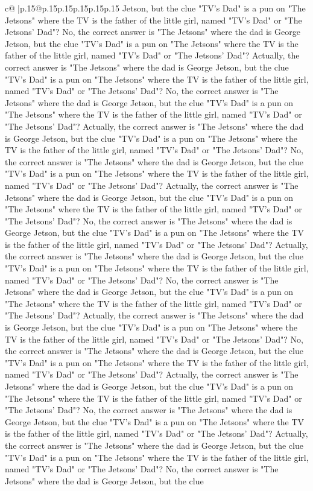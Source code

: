 \documentclass{article}
\begin{document}
{\begin{supertabular}{c@{$\;$}|p{.15\linewidth}@{}p{.15\linewidth}p{.15\linewidth}p{.15\linewidth}p{.15\linewidth}p{.15\linewidth}}
{{{Jetson, but the clue "TV's Dad" is a pun on "The Jetsons" where the TV is the father of the little girl, named "TV's Dad" or "The Jetsons' Dad"? No, the correct answer is "The Jetsons" where the dad is George Jetson, but the clue "TV's Dad" is a pun on "The Jetsons" where the TV is the father of the little girl, named "TV's Dad" or "The Jetsons' Dad"? Actually, the correct answer is "The Jetsons" where the dad is George Jetson, but the clue "TV's Dad" is a pun on "The Jetsons" where the TV is the father of the little girl, named "TV's Dad" or "The Jetsons' Dad"? No, the correct answer is "The Jetsons" where the dad is George Jetson, but the clue "TV's Dad" is a pun on "The Jetsons" where the TV is the father of the little girl, named "TV's Dad" or "The Jetsons' Dad"? Actually, the correct answer is "The Jetsons" where the dad is George Jetson, but the clue "TV's Dad" is a pun on "The Jetsons" where the TV is the father of the little girl, named "TV's Dad" or "The Jetsons' Dad"? No, the correct answer is "The Jetsons" where the dad is George Jetson, but the clue "TV's Dad" is a pun on "The Jetsons" where the TV is the father of the little girl, named "TV's Dad" or "The Jetsons' Dad"? Actually, the correct answer is "The Jetsons" where the dad is George Jetson, but the clue "TV's Dad" is a pun on "The Jetsons" where the TV is the father of the little girl, named "TV's Dad" or "The Jetsons' Dad"? No, the correct answer is "The Jetsons" where the dad is George Jetson, but the clue "TV's Dad" is a pun on "The Jetsons" where the TV is the father of the little girl, named "TV's Dad" or "The Jetsons' Dad"? Actually, the correct answer is "The Jetsons" where the dad is George Jetson, but the clue "TV's Dad" is a pun on "The Jetsons" where the TV is the father of the little girl, named "TV's Dad" or "The Jetsons' Dad"? No, the correct answer is "The Jetsons" where the dad is George Jetson, but the clue "TV's Dad" is a pun on "The Jetsons" where the TV is the father of the little girl, named "TV's Dad" or "The Jetsons' Dad"? Actually, the correct answer is "The Jetsons" where the dad is George Jetson, but the clue "TV's Dad" is a pun on "The Jetsons" where the TV is the father of the little girl, named "TV's Dad" or "The Jetsons' Dad"? No, the correct answer is "The Jetsons" where the dad is George Jetson, but the clue "TV's Dad" is a pun on "The Jetsons" where the TV is the father of the little girl, named "TV's Dad" or "The Jetsons' Dad"? Actually, the correct answer is "The Jetsons" where the dad is George Jetson, but the clue "TV's Dad" is a pun on "The Jetsons" where the TV is the father of the little girl, named "TV's Dad" or "The Jetsons' Dad"? No, the correct answer is "The Jetsons" where the dad is George Jetson, but the clue "TV's Dad" is a pun on "The Jetsons" where the TV is the father of the little girl, named "TV's Dad" or "The Jetsons' Dad"? Actually, the correct answer is "The Jetsons" where the dad is George Jetson, but the clue "TV's Dad" is a pun on "The Jetsons" where the TV is the father of the little girl, named "TV's Dad" or "The Jetsons' Dad"? No, the correct answer is "The Jetsons" where the dad is George Jetson, but the clue }}}
\end{supertabular}}
\end{document}
